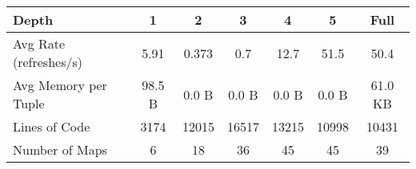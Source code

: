 \begin{tabular}{|l|c|c|c|c|c|c|}\hline
{\bf Depth} & 1 & 2 & 3 & 4 & 5 & Full \\ \hline 
Avg Rate (refreshes/s) & 5.91 & 0.373 & 0.7 & 12.7 & 51.5 & 50.4 \\ \hline 
Avg Memory per Tuple & 98.5 B & 0.0 B & 0.0 B & 0.0 B & 0.0 B & 61.0 KB \\ \hline 
Lines of Code & 3174 & 12015 & 16517 & 13215 & 10998 & 10431 \\ \hline 
Number of Maps &        6 &       18 &       36 &       45 &       45 &       39 \\ \hline 
\end{tabular}